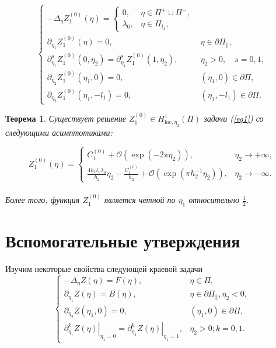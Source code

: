 \documentclass[12pt,titlepage]{report}
\newtheorem{theorem}{Теорема}
\begin{document}
\begin{equation}
	\label{eq1}
	\left\{\begin{array}{ll}
		-\Delta_{\eta} Z_{1}^{(0)}(\eta) =\left\{\begin{array}{ll}
			0, & \eta \in \Pi^{+} \cup \Pi^{-}, \\
			\lambda_{0}, & \eta \in \Pi_{l_{1}},
		\end{array}\right. \\
		\partial_{\eta_{1}} Z_{1}^{(0)}(\eta)=0, & \eta \in \partial \Pi_{\|},\\
		\partial_{\eta_{1}}^{s} Z_{1}^{(0)}\left(0, \eta_{2}\right)=\partial_{\eta_{1}}^{s} Z_{1}^{(0)}\left(1, \eta_{2}\right), & \eta_{2}>0, \quad s=0,1,\\
		\partial_{\eta_{2}} Z_{1}^{(0)}\left(\eta_{1}, 0\right)=0, & \left(\eta_{1}, 0\right) \in \partial \Pi, \quad\\ \partial_{\eta_{2}} Z_{1}^{(0)}\left(\eta_{1},-l_{1}\right)=0, & \left(\eta_{1},-l_{1}\right) \in \partial \Pi.
	\end{array}\right.
\end{equation}

\begin{theorem}
	\label{teor1}
	Существует решение $Z_{1}^{(0)} \in H_{\mathrm{loc}, \eta_{2}}^{1}(\Pi)$ задачи (\ref{eq1}) со следующими асимптотиками:
	
	\begin{equation}
	\label{eq2}
		Z_{1}^{(0)}(\eta)=\left\{\begin{array}{ll}
		C_{1}^{(0)}+\mathcal{O}\left(\exp \left(-2 \pi \eta_{2}\right)\right), & \eta_{2} \rightarrow+\infty, \\
		\frac{4 h_{1} l_{1} \lambda_{0}}{h_{2}} \eta_{2}-\frac{C_{1}^{(0)}}{h_{2}}+\mathcal{O}\left(\exp \left(\pi h_{2}^{-1} \eta_{2}\right)\right), & \eta_{2} \rightarrow-\infty.
		\end{array}\right.
	\end{equation}\\
	Более того, функция $Z_{1}^{(0)}$ является четной по $\eta_{1}$ относительно $\frac{1}{2}$.
\end{theorem}

\newpage
\section{Вспомогательные утверждения}
Изучим некоторые свойства следующей краевой задачи
\begin{equation}
\label{eq3}
	\left\{\begin{array}{ll}
		-\Delta_{\eta} Z(\eta)=F(\eta), & \eta \in \Pi, \\
	\partial_{\eta_{1}} Z(\eta) =B(\eta), & \eta \in \partial \Pi_{\|}, \eta_{2}<0, \\
	\partial_{\eta_{2}} Z\left(\eta_{1}, 0\right)=0, & \left(\eta_1, 0\right) \in \partial \Pi,\\
	\left.\partial_{\eta_{1}}^{k} Z(\eta)\right|_{\eta_{1}=0} =\left.\partial_{\eta_{1}}^{k} Z(\eta)\right|_{\eta_{1}=1}, & \eta_{2}>0 ; k=0,1.
	\end{array}\right.
\end{equation}
\end{document}

